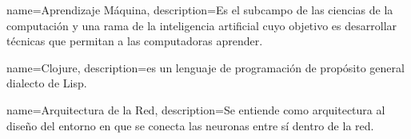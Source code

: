 {
  name={Aprendizaje M\'{a}quina},
  description={Es el subcampo de las ciencias de la computación y una
    rama de la inteligencia artificial cuyo objetivo es desarrollar
    técnicas que permitan a las computadoras aprender.}
}

{
  name={Clojure},
  description={es un lenguaje de programación de propósito general
    dialecto de Lisp.}
}

{
  name={Arquitectura de la Red},
  description={Se entiende como arquitectura al diseño del entorno en
    que se conecta las neuronas entre sí dentro de la red.}
}